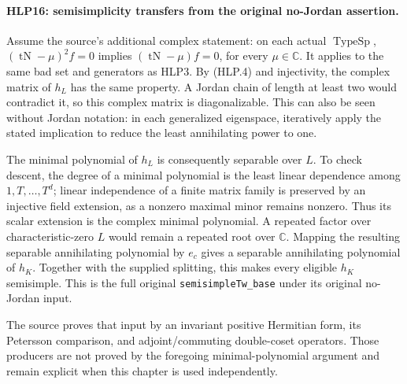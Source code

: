 \paragraph{HLP16: semisimplicity transfers from the original no-Jordan assertion.}
\label{claim:HLP16}
Assume the source's additional complex statement: on each actual
\(\operatorname{TypeSp}\),
\((\operatorname{tN}-\mu)^2f=0\) implies
\((\operatorname{tN}-\mu)f=0\), for every \(\mu\in\mathbb C\).
It applies to the same bad set and generators as HLP3. By (HLP.4)
and injectivity, the complex matrix of \(h_L\) has the same
property. A Jordan chain of length at least two would contradict
it, so this complex matrix is diagonalizable. This can also be
seen without Jordan notation: in each generalized eigenspace,
iteratively apply the stated implication to reduce the least
annihilating power to one.

The minimal polynomial of \(h_L\) is consequently separable over
\(L\). To check descent, the degree of a minimal polynomial is the
least linear dependence among \(1,T,\ldots,T^d\); linear
independence of a finite matrix family is preserved by an injective
field extension, as a nonzero maximal minor remains nonzero.
Thus its scalar extension is the complex minimal polynomial.
A repeated factor over characteristic-zero \(L\) would remain a
repeated root over \(\mathbb C\). Mapping the resulting separable
annihilating polynomial by \(e_c\) gives a separable annihilating
polynomial of \(h_K\). Together with the supplied splitting, this
makes every eligible \(h_K\) semisimple. This is the full original
\texttt{semisimple\allowbreak Tw\_\allowbreak base} under its original no-Jordan input.

The source proves that input by an invariant positive Hermitian
form, its Petersson comparison, and adjoint/commuting double-coset
operators. Those producers are not proved by the foregoing
minimal-polynomial argument and remain explicit when this chapter
is used independently.

